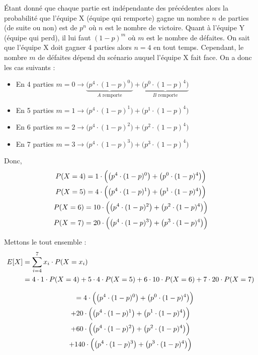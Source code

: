 \documentclass[10pt,a4paper]{article}
\begin{document}
	Étant donné que chaque partie est indépendante des précédentes alors la probabilité que l'équipe X (équipe qui remporte) gagne un nombre $n$ de parties (de suite ou non) est de $p^n$ où $n$ est le nombre de victoire. Quant à l'équipe Y (équipe qui perd), 
	il lui faut $(1 - p)^m$ où $m$ est le nombre de défaites. On sait que l'équipe X doit gagner 4 parties alors $n = 4$ en tout temps. Cependant, le nombre $m$ de défaites dépend du scénario auquel l'équipe X fait face. On a donc les cas suivants :
	\begin{itemize}
		\item En 4 parties $m = 0 \rightarrow \underbrace{\big(p^4 \cdot (1 - p)^0\big)}_{A \text{ remporte}} + \underbrace{\big(p^0 \cdot (1 - p)^4\big)}_{B \text{ remporte}}$
		\item En 5 parties $m = 1 \rightarrow \big(p^4 \cdot (1 - p)^1\big) + \big(p^1 \cdot (1 - p)^4\big)$
		\item En 6 parties $m = 2 \rightarrow \big(p^4 \cdot (1 - p)^2\big) + \big(p^2 \cdot (1 - p)^4\big)$
		\item En 7 parties $m = 3 \rightarrow \big(p^4 \cdot (1 - p)^3\big) + \big(p^3 \cdot (1 - p)^4\big)$
	\end{itemize}

	\noindent Donc,
	\begin{gather}
		P(X = 4) = 1 \cdot \Big(\big(p^4 \cdot (1 - p)^0\big) + \big(p^0 \cdot (1 - p)^4\big)\Big) \notag \\
		P(X = 5) = 4 \cdot \Big(\big(p^4 \cdot (1 - p)^1\big) + \big(p^1 \cdot (1 - p)^4\big)\Big) \notag \\
		P(X = 6) = 10 \cdot \Big(\big(p^4 \cdot (1 - p)^2\big) + \big(p^2 \cdot (1 - p)^4\big)\Big) \notag \\
		P(X = 7) = 20 \cdot \Big(\big(p^4 \cdot (1 - p)^3\big) + \big(p^3 \cdot (1 - p)^4\big)\Big) \notag
	\end{gather}

	\noindent Mettons le tout ensemble :
	\begin{align} 
		E[X] &= \sum^7_{i = 4} x_i \cdot P(X = x_i) \notag \\
		&= 4 \cdot 1 \cdot P(X = 4) + 5 \cdot 4 \cdot P(X = 5) + 6 \cdot 10 \cdot P(X = 6) + 7 \cdot 20 \cdot P(X = 7) \notag
	\end{align}
	
	\vspace{-1cm}
	\begin{multline}
		\hspace{.45cm} = 4 \cdot \Big(\big(p^4 \cdot (1 - p)^0\big) + \big(p^0 \cdot (1 - p)^4\big)\Big) \\ + 20 \cdot \Big(\big(p^4 \cdot (1 - p)^1\big) + \big(p^1 \cdot (1 - p)^4\big)\Big) \\ + 60 \cdot \Big(\big(p^4 \cdot (1 - p)^2\big) + \big(p^2 \cdot (1 - p)^4\big)\Big) \\ + 140 \cdot \Big(\big(p^4 \cdot (1 - p)^3\big) + \big(p^3 \cdot (1 - p)^4\big)\Big) \notag
	\end{multline}
\end{document}
